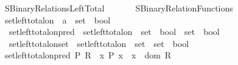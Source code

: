%
\begin{isabellebody}%
%
%
\isadelimdocument
%
\endisadelimdocument
%
\isatagdocument
%
\isamarkuptrue%
%
\endisatagdocument
{\isafolddocument}%
%
\isadelimdocument
%
\endisadelimdocument
%
\isadelimtheory
%
\endisadelimtheory
%
\isatagtheory
{}\isamarkupfalse%
\ SBinary{\isacharunderscore}{\kern0pt}Relations{\isacharunderscore}{\kern0pt}Left{\isacharunderscore}{\kern0pt}Total\isanewline
\ \ \isanewline
\ \ \ \ SBinary{\isacharunderscore}{\kern0pt}Relation{\isacharunderscore}{\kern0pt}Functions\isanewline
{}%
\endisatagtheory
{\isafoldtheory}%
%
\isadelimtheory
\isanewline
%
\endisadelimtheory
\isanewline
{}\isamarkupfalse%
\ set{\isacharunderscore}{\kern0pt}left{\isacharunderscore}{\kern0pt}total{\isacharunderscore}{\kern0pt}on\ {\isacharcolon}{\kern0pt}{\isacharcolon}{\kern0pt}\ {\isachardoublequoteopen}{\isacharprime}{\kern0pt}a\ {\isasymRightarrow}\ set\ {\isasymRightarrow}\ bool{\isachardoublequoteclose}\isanewline
\isanewline
{}\isamarkupfalse%
\isanewline
\ \ set{\isacharunderscore}{\kern0pt}left{\isacharunderscore}{\kern0pt}total{\isacharunderscore}{\kern0pt}on{\isacharunderscore}{\kern0pt}pred\ {\isasymequiv}\ {\isachardoublequoteopen}set{\isacharunderscore}{\kern0pt}left{\isacharunderscore}{\kern0pt}total{\isacharunderscore}{\kern0pt}on\ {\isacharcolon}{\kern0pt}{\isacharcolon}{\kern0pt}\ {\isacharparenleft}{\kern0pt}set\ {\isasymRightarrow}\ bool{\isacharparenright}{\kern0pt}\ {\isasymRightarrow}\ set\ {\isasymRightarrow}\ bool{\isachardoublequoteclose}\isanewline
\ \ set{\isacharunderscore}{\kern0pt}left{\isacharunderscore}{\kern0pt}total{\isacharunderscore}{\kern0pt}on{\isacharunderscore}{\kern0pt}set\ {\isasymequiv}\ {\isachardoublequoteopen}set{\isacharunderscore}{\kern0pt}left{\isacharunderscore}{\kern0pt}total{\isacharunderscore}{\kern0pt}on\ {\isacharcolon}{\kern0pt}{\isacharcolon}{\kern0pt}\ set\ {\isasymRightarrow}\ set\ {\isasymRightarrow}\ bool{\isachardoublequoteclose}\isanewline
{}\isanewline
\ \ \isamarkupfalse%
\ {\isachardoublequoteopen}set{\isacharunderscore}{\kern0pt}left{\isacharunderscore}{\kern0pt}total{\isacharunderscore}{\kern0pt}on{\isacharunderscore}{\kern0pt}pred\ P\ R\ {\isasymequiv}\ {\isasymforall}x{\isachardot}{\kern0pt}\ P\ x\ {\isasymlongrightarrow}\ x\ {\isasymin}\ dom\ R{\isachardoublequoteclose}\isanewline

\end{isabellebody}
